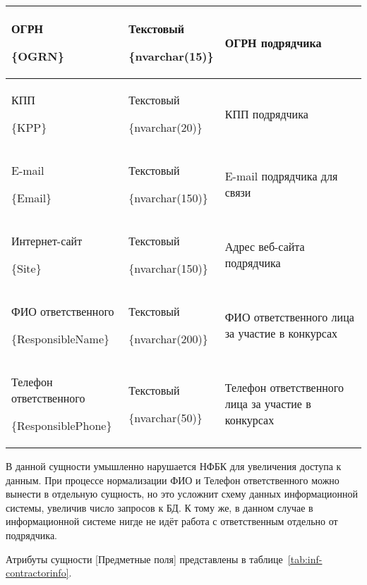 \begin{footnotesize}
\begin{longtable}[h]{|p{}|p{}|p{}|}
	ОГРН \par \{OGRN\} & Текстовый \par \{nvarchar(15)\} & ОГРН подрядчика \\ \hline
	КПП \par \{KPP\} & Текстовый \par \{nvarchar(20)\} & КПП подрядчика \\ \hline
	E-mail \par \{Email\} & Текстовый \par \{nvarchar(150)\} & E-mail подрядчика для связи \\ \hline
	Интернет-сайт \par \{Site\} & Текстовый \par \{nvarchar(150)\} & Адрес веб-сайта подрядчика \\ \hline
	ФИО ответственного \par \{ResponsibleName\} & Текстовый \par \{nvarchar(200)\} & ФИО ответственного лица за участие в конкурсах \\ \hline
	Телефон ответственного \par \{ResponsiblePhone\} & Текстовый \par \{nvarchar(50)\} & Телефон ответственного лица за участие в конкурсах \\ \hline
\end{longtable}
\end{footnotesize}

В данной сущности умышленно нарушается НФБК для увеличения доступа к данным.
При процессе нормализации ФИО и Телефон ответственного можно вынести в отдельную сущность, но это усложнит схему данных информационной системы, увеличив число запросов к БД.
К тому же, в данном случае в информационной системе нигде не идёт работа с ответственным отдельно от подрядчика.

Атрибуты сущности [Предметные поля] представлены в таблице~\ref{tab:inf-contractorinfo}.

